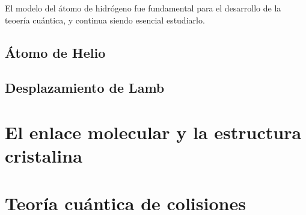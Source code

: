\documentclass[12pt,a4paper]{article}
\numberwithin{equation}{section}
\numberwithin{figure}{section}
\begin{document}
El modelo del átomo de hidrógeno fue fundamental para el desarrollo de la teoería cuántica, y continua siendo esencial estudiarlo. 

\subsection{Átomo de Helio}

\subsection{Desplazamiento de Lamb}

\section{El enlace molecular y la estructura cristalina}

\section{Teoría cuántica de colisiones}
\end{document}
